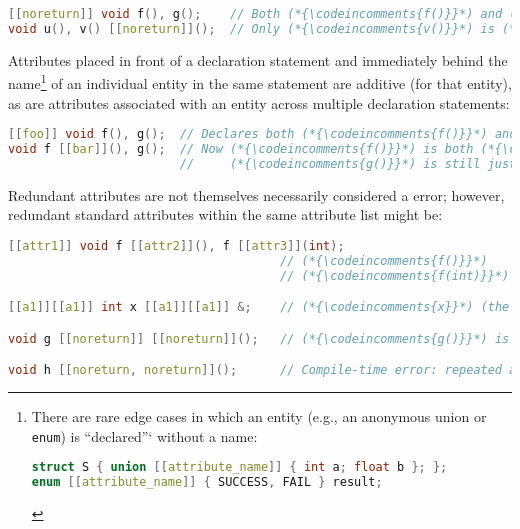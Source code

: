 \documentclass[twoside,10pt,letterpaper,usenames]{newstyle-PearsonGeneric-7-38}
\newcommand{\codeincomments}{\color{skyblue}\ttfamily}
\begin{document}
\begin{lstlisting}[language=C++]
[[noreturn]] void f(), g();    // Both (*{\codeincomments{f()}}*) and (*{\codeincomments{g()}}*) are (*{\codeincomments{noreturn}}*).
void u(), v() [[noreturn]]();  // Only (*{\codeincomments{v()}}*) is (*{\codeincomments{noreturn}}*).
\end{lstlisting}
    

Attributes placed in front of a declaration statement and immediately
behind the name{\cprotect\footnote{There are rare edge cases in which an
entity (e.g., an anonymous union or \texttt{enum}) is ``declared''`
without a name:

\begin{lstlisting}[language=C++, basicstyle={\ttfamily\footnotesize}]
struct S { union [[attribute_name]] { int a; float b }; };
enum [[attribute_name]] { SUCCESS, FAIL } result;
\end{lstlisting}
}} of an individual entity in the same statement are additive (for
that entity), as are attributes associated with an entity across
multiple declaration statements:

\begin{lstlisting}[language=C++]
[[foo]] void f(), g();  // Declares both (*{\codeincomments{f()}}*) and (*{\codeincomments{g()}}*) to be (*{\codeincomments{foo}}*).
void f [[bar]](), g();  // Now (*{\codeincomments{f()}}*) is both (*{\codeincomments{foo}}*) and (*{\codeincomments{bar}}*) while
                        //     (*{\codeincomments{g()}}*) is still just (*{\codeincomments{foo}}*).
\end{lstlisting}
    

Redundant attributes are not themselves necessarily considered a error;
however, redundant standard attributes within the same attribute list
might be:

\begin{lstlisting}[language=C++]
[[attr1]] void f [[attr2]](), f [[attr3]](int);
                                      // (*{\codeincomments{f()}}*)    is (*{\codeincomments{attr1}}*) and (*{\codeincomments{attr2}}*)
                                      // (*{\codeincomments{f(int)}}*) is (*{\codeincomments{attr1}}*) and (*{\codeincomments{attr3}}*)

[[a1]][[a1]] int x [[a1]][[a1]] &;    // (*{\codeincomments{x}}*) (the reference itself) is (*{\codeincomments{a1}}*)

void g [[noreturn]] [[noreturn]]();   // (*{\codeincomments{g()}}*) is (*{\codeincomments{noreturn}}*)

void h [[noreturn, noreturn]]();      // Compile-time error: repeated attribute
\end{lstlisting}
    
\end{document}
